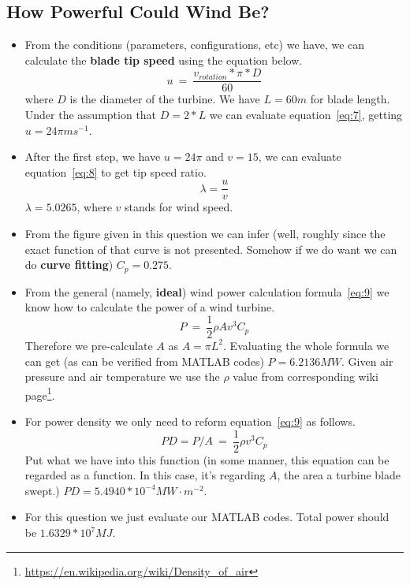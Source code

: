 \documentclass[12pt]{article}
\begin{document}
\subsection{How Powerful Could Wind Be?}
\label{sec:how-powerful-could}

\begin{itemize}
\item From the conditions (parameters, configurations, etc) we have,
  we can calculate the \textbf{blade tip speed} using the equation
  below.
  \begin{equation}
    \label{eq:7}
    u~=~\frac{v_{rotation}*\pi*D}{60}
  \end{equation}
  where $D$ is the diameter of the turbine. We have $L=60m$ for blade
  length. Under the assumption that $D=2*L$ we can evaluate
  equation~\eqref{eq:7}, getting $u=24\pi ms^{-1}$.
\item After the first step, we have $u=24\pi$ and $v=15$, we can
  evaluate equation~\eqref{eq:8} to get tip speed ratio.
  \begin{equation}
    \label{eq:8}
    \lambda=\frac{u}{v}
  \end{equation}
  $\lambda=5.0265$, where $v$ stands for wind speed.
\item From the figure given in this question we can infer (well,
  roughly since the exact function of that curve is not
  presented. Somehow if we do want we can do \textbf{curve fitting})
  $C_{p}=0.275$.
\item From the general (namely, \textbf{ideal}) wind power calculation
  formula~\eqref{eq:9} we know how to calculate the power of a wind
  turbine.
  \begin{equation}
    \label{eq:9}
    P~=~\frac{1}{2}\rho Av^{3}C_{p}
  \end{equation}
  Therefore we pre-calculate $A$ as $A=\pi L^{2}$. Evaluating the
  whole formula we can get (as can be verified from MATLAB codes)
  $P=6.2136MW$. Given air pressure and air temperature we use the
  $\rho$ value from corresponding wiki
  page\footnote{\url{https://en.wikipedia.org/wiki/Density_of_air}}. 
\item For power density we only need to reform equation~\eqref{eq:9}
  as follows.
  \begin{equation}
    \label{eq:10}
    PD=P/A~=~\frac{1}{2}\rho v^{3}C_{p}
  \end{equation}
  Put what we have into this function (in some manner, this equation
  can be regarded as a function. In this case, it's regarding $A$, the
  area a turbine blade swept.) $PD=5.4940*10^{-4}MW\cdot m^{-2}$.
\item For this question we just evaluate our MATLAB codes. Total power
  should be $1.6329*10^{7}MJ$.
\end{itemize}
\end{document}
